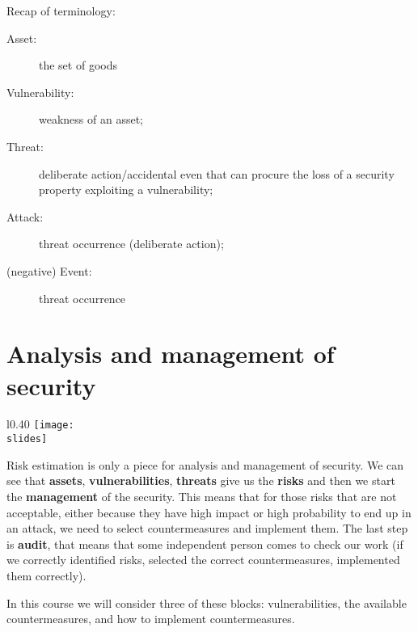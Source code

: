 \bigskip
Recap of terminology:
\begin{description}
  \item[Asset:] the set of goods
  \item[Vulnerability:] weakness of an asset; 
  \item[Threat:] deliberate action/accidental even that can procure the loss of a security property exploiting a vulnerability;
  \item[Attack:] threat occurrence (deliberate action);
  \item[(negative) Event:] threat occurrence     
\end{description}


 {}


\section{Analysis and management of security}

\begin{wrapfigure}{l}{0.40\textwidth}
  \centering
  \texttt{[image: \\slides]}
\end{wrapfigure}
Risk estimation is only a piece for analysis and management of security. We can see that \textbf{assets}, \textbf{vulnerabilities}, \textbf{threats} give us the \textbf{risks} and then we start the \textbf{management} of the security. This means that for those risks that are not acceptable, either because they have high impact or high probability to end up in an attack, we need to select countermeasures and implement them. The last step is \textbf{audit}, that means that some independent person comes to check our work (if we correctly identified risks, selected the correct countermeasures, implemented them correctly).

In this course we will consider three of these blocks: vulnerabilities, the available countermeasures, and how to implement countermeasures.


